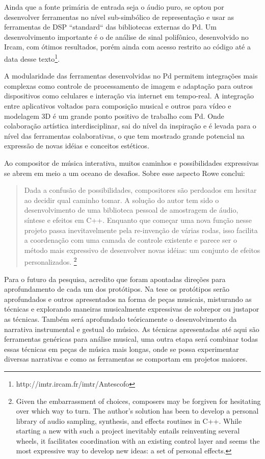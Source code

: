 \documentclass[draft]{ppgmus}
\begin{document}
Ainda que a fonte primária de entrada seja o áudio puro, se optou por
desenvolver ferramentas no nível sub-simbólico de representação e usar as ferramentas
de DSP ``standard`` das bibliotecas externas do Pd. Um desenvolvimento importante
é o de análise de sinal polifônico, desenvolvido no Ircam, com ótimos resultados,
porém ainda com acesso restrito
ao código até a data desse texto\footnote{http://imtr.ircam.fr/imtr/Antescofo}.    


A modularidade das ferramentas desenvolvidas no Pd permitem
integrações mais complexas como controle de  processamento de imagem
e adaptação para outros dispositivos como celulares e interação via internet
em tempo-real. A integração entre aplicativos voltados para composição musical
e outros para vídeo e modelagem 3D é um grande ponto positivo de trabalho com
Pd. Onde colaboração artística interdisciplinar, sai do nível da inspiração e é levada para 
o nível das ferramentas colaborativas, o que tem mostrado grande potencial na expressão
de novas idéias e conceitos estéticos.

Ao compositor de música interativa, muitos caminhos e possibilidades
expressivas se abrem em meio a um oceano de desafios. Sobre esse aspecto
Rowe conclui:

\begin{quote}
Dada a confusão de possibilidades, compositores
são perdoados em hesitar ao decidir qual caminho
tomar. A solução do autor tem sido o desenvolvimento
de uma biblioteca pessoal de amostragem de áudio, síntese e
efeitos em C++. Enquanto que começar uma nova função
nesse projeto passa inevitavelmente pela re-invenção
de várias rodas, isso facilita a coordenação com uma
camada de controle existente e parece ser o método 
mais expressivo de desenvolver novas idéias: um
conjunto de efeitos personalizados. \cite{rowe09:levels}
\footnote{Given the embarrassment of choices,
composers may be forgiven for hesitating over
which way to turn. The author's solution has
been to develop a personal library of audio
sampling, synthesis, and effects routines in C++.
While starting a new with such a project
inevitably entails reinventing several wheels, it
facilitates coordination with an existing control
layer and seems the most expressive
way to develop new ideas: a set of personal
effects.} 
\end{quote}


Para o futuro da pesquisa, acredito que foram apontadas direções para aprofundamento
de cada um dos protótipos. Na tese os  protótipos serão aprofundados e 
outros apresentados na forma de peças musicais, misturando as técnicas e explorando 
maneiras musicalmente expressivas de
sobrepor ou justapor as técnicas. Também será aprofundado teóricamente o 
desenvolvimento da narrativa instrumental e gestual do músico. 
As técnicas apresentadas até aqui são ferramentas genéricas para análise musical,
uma outra etapa será combinar todas essas técnicas em peças de música mais longas,
onde se possa experimentar diversas narrativas e como as ferramentas se comportam
em projetos maiores.
\end{document}
